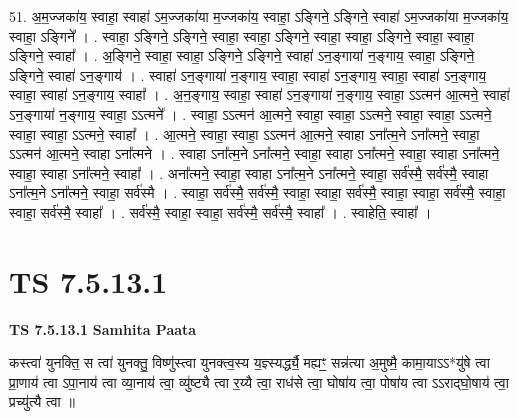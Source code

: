 \documentclass[17pt]{extarticle}
\begin{document}
51. अ॒म॒ज्जका॑य॒ स्वाहा॒ स्वाहा॑ ऽम॒ज्जका॑या म॒ज्जका॑य॒ स्वाहा॒ ऽङ्गिने॒ ऽङ्गिने॒ स्वाहा॑ ऽम॒ज्जका॑या म॒ज्जका॑य॒ स्वाहा॒ ऽङ्गिने᳚ । . स्वाहा॒ ऽङ्गिने॒ ऽङ्गिने॒ स्वाहा॒ स्वाहा॒ ऽङ्गिने॒ स्वाहा॒ स्वाहा॒ ऽङ्गिने॒ स्वाहा॒ स्वाहा॒ ऽङ्गिने॒ स्वाहा᳚ । . अ॒ङ्गिने॒ स्वाहा॒ स्वाहा॒ ऽङ्गिने॒ ऽङ्गिने॒ स्वाहा॑ ऽन॒ङ्गाया॑ न॒ङ्गाय॒ स्वाहा॒ ऽङ्गिने॒ ऽङ्गिने॒ स्वाहा॑ ऽन॒ङ्गाय॑ । . स्वाहा॑ ऽन॒ङ्गाया॑ न॒ङ्गाय॒ स्वाहा॒ स्वाहा॑ ऽन॒ङ्गाय॒ स्वाहा॒ स्वाहा॑ ऽन॒ङ्गाय॒ स्वाहा॒ स्वाहा॑ ऽन॒ङ्गाय॒ स्वाहा᳚ । . अ॒न॒ङ्गाय॒ स्वाहा॒ स्वाहा॑ ऽन॒ङ्गाया॑ न॒ङ्गाय॒ स्वाहा॒ ऽऽत्मन॑ आ॒त्मने॒ स्वाहा॑ ऽन॒ङ्गाया॑ न॒ङ्गाय॒ स्वाहा॒ ऽऽत्मने᳚ । . स्वाहा॒ ऽऽत्मन॑ आ॒त्मने॒ स्वाहा॒ स्वाहा॒ ऽऽत्मने॒ स्वाहा॒ स्वाहा॒ ऽऽत्मने॒ स्वाहा॒ स्वाहा॒ ऽऽत्मने॒ स्वाहा᳚ । . आ॒त्मने॒ स्वाहा॒ स्वाहा॒ ऽऽत्मन॑ आ॒त्मने॒ स्वाहा ऽना᳚त्म॒ने ऽना᳚त्मने॒ स्वाहा॒ ऽऽत्मन॑ आ॒त्मने॒ स्वाहा ऽना᳚त्मने । . स्वाहा ऽना᳚त्म॒ने ऽना᳚त्मने॒ स्वाहा॒ स्वाहा ऽना᳚त्मने॒ स्वाहा॒ स्वाहा ऽना᳚त्मने॒ स्वाहा॒ स्वाहा ऽना᳚त्मने॒ स्वाहा᳚ । . अना᳚त्मने॒ स्वाहा॒ स्वाहा ऽना᳚त्म॒ने ऽना᳚त्मने॒ स्वाहा॒ सर्व॑स्मै॒ सर्व॑स्मै॒ स्वाहा ऽना᳚त्म॒ने ऽना᳚त्मने॒ स्वाहा॒ सर्व॑स्मै । . स्वाहा॒ सर्व॑स्मै॒ सर्व॑स्मै॒ स्वाहा॒ स्वाहा॒ सर्व॑स्मै॒ स्वाहा॒ स्वाहा॒ सर्व॑स्मै॒ स्वाहा॒ स्वाहा॒ सर्व॑स्मै॒ स्वाहा᳚ । . सर्व॑स्मै॒ स्वाहा॒ स्वाहा॒ सर्व॑स्मै॒ सर्व॑स्मै॒ स्वाहा᳚ । . स्वाहेति॒ स्वाहा᳚ । \newline
\pagebreak
{}

\section{ TS 7.5.13.1 }

\textbf{TS 7.5.13.1 } \newline
\textbf{Samhita Paata} \newline

कस्त्वा॑ युनक्ति॒ स त्वा॑ युनक्तु॒ विष्णु॑स्त्वा युनक्त्व॒स्य य॒ज्ञ्स्यर्द्ध्यै॒ मह्यꣳ॒॒ सन्न॑त्या अ॒मुष्मै॒ कामा॒याऽऽ*यु॑षे त्वा प्रा॒णाय॑ त्वा ऽपा॒नाय॑ त्वा व्या॒नाय॑ त्वा॒ व्यु॑ष्ट्यै त्वा र॒य्यै त्वा॒ राध॑से त्वा॒ घोषा॑य त्वा॒ पोषा॑य त्वा ऽऽराद्घो॒षाय॑ त्वा॒ प्रच्यु॑त्यै त्वा ॥ \newline
\end{document}
